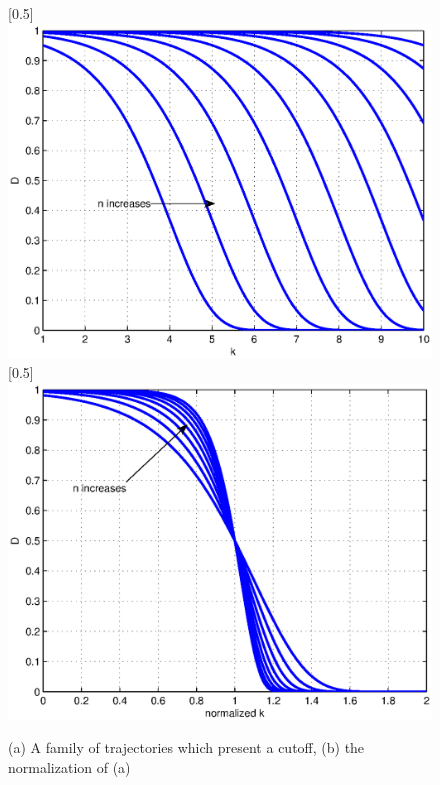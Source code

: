 \documentclass{article}
\begin{document}
\begin{figure}
 \centerline{
  \scalebox{0.5}[0.5]{\includegraphics{democutoff1.eps}}
  \scalebox{0.5}[0.5]{\includegraphics{democutoff1n.eps}}
} \caption{(a) A family of trajectories which present a cutoff, (b) the normalization of (a)}
  \label{democutoff1}
\end{figure}
\end{document}
